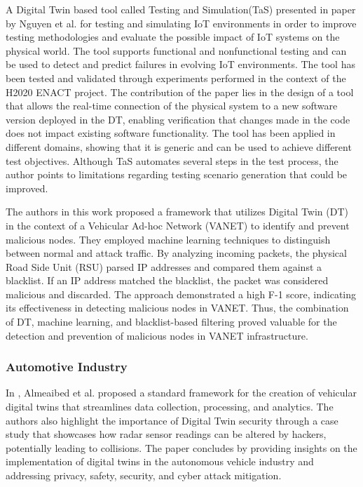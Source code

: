A Digital Twin based tool called Testing and Simulation(TaS) presented in\cite{luongnguyenDigitalTwinIoT2022} paper by Nguyen et al. for testing and simulating IoT environments in order to improve testing methodologies and evaluate the possible impact of IoT systems on the physical world. The tool supports functional and nonfunctional testing and can be used to detect and predict failures in evolving IoT environments. The tool has been tested and validated through experiments performed in the context of the H2020 ENACT project. The contribution of the paper lies in the design of a tool that allows the real-time connection of the physical system to a new software version deployed in the DT, enabling verification that changes made in the code does not impact existing software functionality. The tool has been applied in different domains, showing that it is generic and can be used to achieve different test objectives. Although TaS automates several steps in the test process, the author points to limitations regarding testing scenario generation that could be improved.

The authors in this \cite{aryaDetectionMaliciousNode2023a} work proposed a framework that utilizes Digital Twin (DT) in the context of a Vehicular Ad-hoc Network (VANET) to identify and prevent malicious nodes. They employed machine learning techniques to distinguish between normal and attack traffic. By analyzing incoming packets, the physical Road Side Unit (RSU) parsed IP addresses and compared them against a blacklist. If an IP address matched the blacklist, the packet was considered malicious and discarded. The approach demonstrated a high F-1 score, indicating its effectiveness in detecting malicious nodes in VANET. Thus, the combination of DT, machine learning, and blacklist-based filtering proved valuable for the detection and prevention of malicious nodes in VANET infrastructure.








\subsubsection*{Automotive Industry}
In \cite{almeaibedDigitalTwinAnalysis2021}, Almeaibed et al. proposed a standard framework for the creation of vehicular digital twins that streamlines data collection, processing, and analytics. The authors also highlight the importance of Digital Twin security through a case study that showcases how radar sensor readings can be altered by hackers, potentially leading to collisions. The paper concludes by providing insights on the implementation of digital twins in the autonomous vehicle industry and addressing privacy, safety, security, and cyber attack mitigation.

